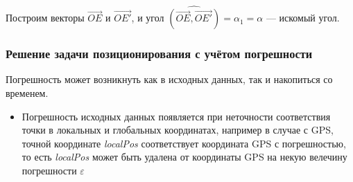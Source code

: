 \documentclass[a4paper, 11pt, titlepage]{article}
\begin{document}
          Построим векторы $\vec{OE}$ и $\vec{OE'}$, и угол $\widehat{(\vec{OE}, \vec{OE'})} = \alpha_1 = \alpha$ --- искомый угол.

            
        \subsubsection{Решение задачи позиционирования с учётом погрешности}
          Погрешность может возникнуть как в исходных данных, так и накопиться со временем.
          \begin{itemize}
             \item Погрешность исходных данных появляется при неточности соответствия точки в локальных и глобальных координатах,
             например в случае с GPS, точной координате \textit{localPos} соответствует координата GPS с погрешностью, то есть \textit{localPos}
             может быть удалена от координаты GPS на некую велечину погрешности $\varepsilon$ 
             \begin{figure}[H]
              \centering
\end{figure}
\end{itemize}
\end{document}
